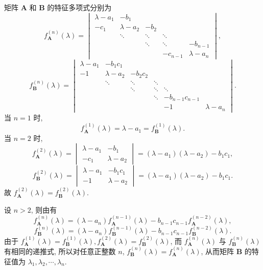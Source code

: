 \documentclass[../../main.tex]{subfiles}
\begin{document}
\begin{solution}
矩阵 \(\boldsymbol{A}\) 和 \(\boldsymbol{B}\) 的特征多项式分别为
\[
f_{\boldsymbol{A}}^{(n)}(\lambda) = \begin{vmatrix} \lambda - a_1 & -b_1 \\ -c_1 & \lambda - a_2 & -b_2 \\ & \ddots & \ddots & \ddots \\ & & \ddots & \ddots & -b_{n - 1} \\ & & & -c_{n - 1} & \lambda - a_n \end{vmatrix},
\]
\[
f_{\boldsymbol{B}}^{(n)}(\lambda) = \begin{vmatrix} \lambda - a_1 & -b_1c_1 \\ -1 & \lambda - a_2 & -b_2c_2 \\ & \ddots & \ddots & \ddots \\ & & \ddots & \ddots & \ddots \\ & & & \ddots & -b_{n - 1}c_{n - 1} \\ & & & & -1 & \lambda - a_n \end{vmatrix}.
\]
当 \(n = 1\) 时,
\[
f_{\boldsymbol{A}}^{(1)}(\lambda) = \lambda - a_1 = f_{\boldsymbol{B}}^{(1)}(\lambda).
\]
当 \(n = 2\) 时,
\[
f_{\boldsymbol{A}}^{(2)}(\lambda) = \begin{vmatrix} \lambda - a_1 & -b_1 \\ -c_1 & \lambda - a_2 \end{vmatrix} = (\lambda - a_1)(\lambda - a_2) - b_1c_1,
\]
\[
f_{\boldsymbol{B}}^{(2)}(\lambda) = \begin{vmatrix} \lambda - a_1 & -b_1c_1 \\ -1 & \lambda - a_2 \end{vmatrix} = (\lambda - a_1)(\lambda - a_2) - b_1c_1.
\]
故 \(f_{\boldsymbol{A}}^{(2)}(\lambda) = f_{\boldsymbol{B}}^{(2)}(\lambda)\).

设 \(n > 2\), 则由有
\[
f_{\boldsymbol{A}}^{(n)}(\lambda) = (\lambda - a_n)f_{\boldsymbol{A}}^{(n - 1)}(\lambda) - b_{n - 1}c_{n - 1}f_{\boldsymbol{A}}^{(n - 2)}(\lambda),
\]
\[
f_{\boldsymbol{B}}^{(n)}(\lambda) = (\lambda - a_n)f_{\boldsymbol{B}}^{(n - 1)}(\lambda) - b_{n - 1}c_{n - 1}f_{\boldsymbol{B}}^{(n - 2)}(\lambda).
\]
由于 \(f_{\boldsymbol{A}}^{(1)}(\lambda) = f_{\boldsymbol{B}}^{(1)}(\lambda), f_{\boldsymbol{A}}^{(2)}(\lambda) = f_{\boldsymbol{B}}^{(2)}(\lambda)\), 而 \(f_{\boldsymbol{A}}^{(n)}(\lambda)\) 与 \(f_{\boldsymbol{B}}^{(n)}(\lambda)\) 有相同的递推式, 所以对任意正整数 \(n\), \(f_{\boldsymbol{B}}^{(n)}(\lambda) = f_{\boldsymbol{A}}^{(n)}(\lambda)\), 从而矩阵 \(\boldsymbol{B}\) 的特征值为 \(\lambda_1, \lambda_2, \cdots, \lambda_n\).
\end{solution}
\end{document}
